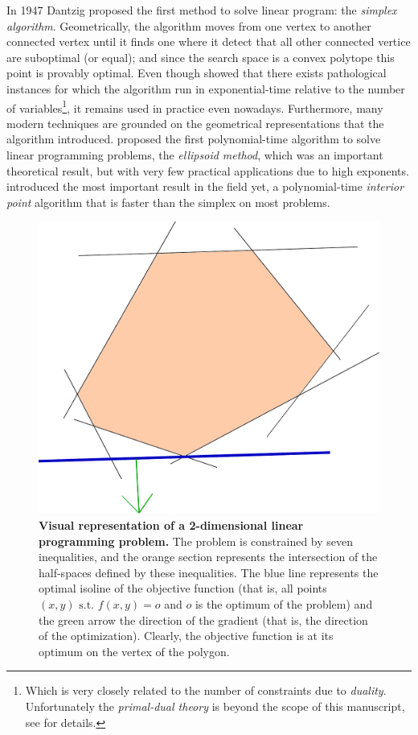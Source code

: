 	In 1947 Dantzig proposed the first method to solve linear program: the \emph{simplex algorithm}.
	Geometrically, the algorithm moves from one vertex to another connected vertex until it finds one where it detect that all other connected vertice are suboptimal (or equal); and since the search space is a convex polytope this point is provably optimal.
	Even though \textcite{klee1970good} showed that there exists pathological instances for which the algorithm run in exponential-time relative to the number of variables\footnote{Which is very closely related to the number of constraints due to \emph{duality}. Unfortunately the \emph{primal-dual theory} is beyond the scope of this manuscript, see \parencite{papadimitriou1982combinatorial} for details.}, it remains used in practice even nowadays.
	Furthermore, many modern techniques are grounded on the geometrical representations that the algorithm introduced.
	\Textcite{khachiyan1980polynomial} proposed the first polynomial-time algorithm to solve linear programming problems, the \emph{ellipsoid method}, which was an important theoretical result, but with very few practical applications due to high exponents.
	\Textcite{karmarkar1984new} introduced the most important result in the field yet, a polynomial-time \emph{interior point} algorithm that is faster than the simplex on most problems.

	\begin{figure}[t]
		\centering
		\includegraphics[width=0.65\columnwidth]{img/linopt.pdf}
		\caption[Visual representation of a 2d linear programming problem]{\textbf{Visual representation of a 2-dimensional linear programming problem.}
			The problem is constrained by seven inequalities, and the orange section represents the intersection of the half-spaces defined by these inequalities. The blue line represents the optimal isoline of the objective function (that is, all points $(x,y)\text{ s.t. }f(x,y) = o$ and $o$ is the optimum of the problem) and the green arrow the direction of the gradient (that is, the direction of the optimization). Clearly, the objective function is at its optimum on the vertex of the polygon.
		}
		\label{fig:linearprog}
	\end{figure}

